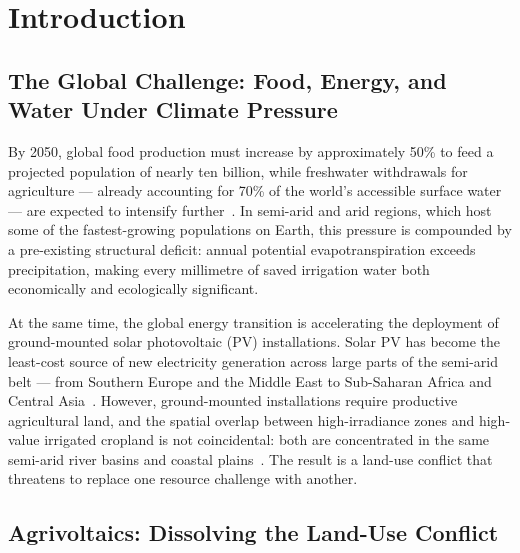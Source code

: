 
\section{Introduction}
\label{sec:intro}

\subsection{The Global Challenge: Food, Energy, and Water Under Climate Pressure}

\hspace{1cm}By 2050, global food production must increase by approximately
50\% to feed a projected population of nearly ten billion, while freshwater
withdrawals for agriculture --- already accounting for 70\% of the world's
accessible surface water --- are expected to intensify
further~\citep{fao2017, scanlon2023}. In semi-arid and arid regions, which
host some of the fastest-growing populations on Earth, this pressure is
compounded by a pre-existing structural deficit: annual potential
evapotranspiration exceeds precipitation, making every millimetre of saved
irrigation water both economically and ecologically significant.

At the same time, the global energy transition is accelerating the
deployment of ground-mounted solar photovoltaic (PV) installations.
Solar PV has become the least-cost source of new electricity generation
across large parts of the semi-arid belt --- from Southern Europe and the
Middle East to Sub-Saharan Africa and Central Asia~\citep{irena2022}.
However, ground-mounted installations require productive agricultural land,
and the spatial overlap between high-irradiance zones and high-value
irrigated cropland is not coincidental: both are concentrated in the
same semi-arid river basins and coastal plains~\citep{dinesh2016,
ketzer2020}. The result is a land-use conflict that threatens to replace
one resource challenge with another.

\subsection{Agrivoltaics: Dissolving the Land-Use Conflict}

